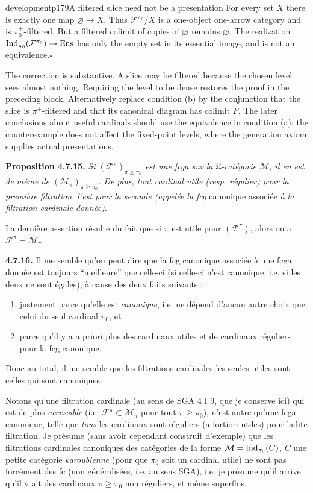\begin{dcomment}{development}{p179}{A filtered slice need not be a presentation}
For every set $X$ there is exactly one map $\varnothing\to X$. Thus $\mathcal F^{\pi_0}/X$ is a one-object one-arrow category and is $\pi_0^+$-filtered. But a filtered colimit of copies of $\varnothing$ remains $\varnothing$. The realization $\operatorname{Ind}_{\pi_0}(\mathcal F^{\pi_0})\to\mathrm{Ens}$ has only the empty set in its essential image, and is not an equivalence.\hfill$\square$

The correction is substantive. A slice may be filtered because the chosen level sees almost nothing. Requiring the level to be dense restores the proof in the preceding block. Alternatively replace condition (b) by the conjunction that the slice is $\pi^+$-filtered and that its canonical diagram has colimit $F$. The later conclusions about useful cardinals should use the equivalence in condition (a); the counterexample does not affect the fixed-point levels, where the generation axiom supplies actual presentations.
\end{dcomment}


\textbf{Proposition 4.7.15.} \textit{Si $(\mathcal{F}^{\pi})_{\pi\geqslant\pi_0}$ est une fcga sur la $\mathfrak{U}$-catégorie $\mathcal{M}$, il en est de même de $(\mathcal{M}_\pi)_{\pi\geqslant\pi_0}$. De plus, tout cardinal utile (resp. régulier) pour la première filtration, l'est pour la seconde (appelée la fcg} canonique associée \textit{à la filtration cardinale} \textit{donnée).}

La dernière assertion résulte du fait que si $\pi$ est utile pour $(\mathcal{F}^{\pi})$, alors on a $\mathcal{F}^{\pi}=\mathcal{M}_\pi$.

\textbf{4.7.16.} Il me semble qu'on peut dire que la fcg canonique associée à une fcga donnée
est toujours ``meilleure'' que celle-ci (si celle-ci n'est canonique, i.e. si les deux ne sont égales), à cause des deux faits suivants :
\begin{enumerate}[label=\alph*)]
\item justement parce qu'elle est \textit{canonique}, i.e. ne dépend d'aucun autre choix que celui du seul cardinal $\pi_0$, et
\item parce qu'il y a a priori plus des cardinaux utiles et de cardinaux réguliers pour la fcg canonique.
\end{enumerate}
Donc au total, il me semble que les filtrations cardinales les seules utiles sont celles qui sont canoniques.

\noindent{}
Notons qu'une filtration cardinale (au sens de SGA 4 I 9, que je conserve ici) qui est de plus \textit{accessible} (i.e. $\mathcal{F}^{\pi}\subset\mathcal{M}_\pi$ pour tout $\pi\geqslant\pi_0$), n'est autre qu'une fcga canonique, telle que \textit{tous} les cardinaux sont réguliers (a fortiori utiles) pour ladite filtration. Je présume (sans avoir cependant construit d'exemple) que les filtrations cardinales canoniques des catégories de la forme $\mathcal{M}=\operatorname{Ind}_{\pi_0}(C)$, $C$ une petite catégorie \textit{karoubienne} (pour que $\pi_0$ soit un cardinal utile) ne sont pas forcément des fc (non généralisées, i.e. au sens SGA), i.e. je présume qu'il arrive qu'il y ait des cardinaux $\pi\geqslant\pi_0$ non réguliers, et même superflus.

